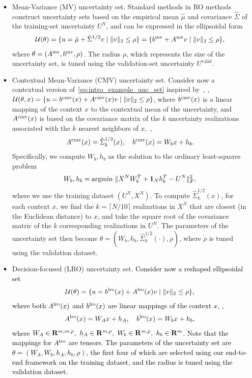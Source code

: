 \documentclass[11pt]{article}
\newcommand{\RC}[1]{\textcolor{black}{#1}}
\begin{document}
\begin{itemize}
    \item  Mean-Variance (MV) uncertainty set. 
Standard methods in \gls{RO} methods construct uncertainty sets based on
the empirical mean $\hat{\mu}$ and covariance $\hat{\Sigma}$ of the training-set uncertainty $U^{N}$, and can be expressed in the ellipsoidal form
\begin{equation}\label{eq:intro_example_unc_set}
	{\mathcal{U}}{(\theta)} = \{u = \hat{\mu} + \hat{\Sigma}^{1/2} v \mid \|v\|_2 \leq \rho\} = \{b^{\rm mv} + A^{\rm mv} v \mid \|v\|_2 \leq \rho\},
\end{equation}
where $\theta = (A^{\rm mv}, b^{\rm mv},\rho)$. 
The radius $\rho$, which represents the size of the uncertainty set, is tuned using the validation-set uncertainty $U^{\text{valid}}$.
\item Contextual Mean-Variance (CMV) uncertainty set. Consider now a contextual version of~\eqref{eq:intro_example_unc_set} inspired by~\cite{knn}, \ie,
${\mathcal{U}}(\theta,x) =\{u = b^{\rm cmv}(x) + A^{\rm cmv}(x)v \mid \|v\|_2 \leq \rho\}$, where $b^{\rm cmv}(x)$ is a linear mapping of the context $x$ to the contextual mean of the uncertainty, and $A^{\rm cmv}(x)$ is based on the covariance matrix of the $k$ uncertainty realizations associated with the $k$ nearest neighbors of $x$,~\ie,
\begin{equation}
    A^{\rm cmv}(x) = \hat{\Sigma}_k^{1/2}(x),\quad b^{\rm cmv}(x) = W_bx+h_b.
\end{equation} 
 Specifically, we compute $W_b,h_b$ as the solution to the ordinary least-squares problem
$$W_b,h_b=\text{argmin}~\|X^N W_b^T + \mathbf 1_{N}h_b^T - U^N\|_F^2,$$
where we use the training dataset $(U^N, X^N)$. To compute $\hat{\Sigma}_k^{1/2}(x)$, for each context $x$, we find the $k = \lceil N/10\rceil$ realizations in $X^N$ that are closest (in the Euclidean distance) to $x$, and take the square root of the covariance matric of the $k$ corresponding realizations in $U^N$. The parameters of the uncertainty set then become $\theta = (W_b,h_b, \hat{\Sigma}_k^{1/2}(\cdot),\rho)$, where $\rho$ is tuned using the validation dataset. 
\item Decision-focused (LRO) uncertainty set.
\RC{Consider now a reshaped ellipsoidal set
$${\mathcal{U}}(\theta) =\{u = b^{\rm lro}(x) + A^{\rm lro}(x) v \mid \|v\|_2 \leq \rho\},$$ where both $A^{\rm lro}(x)$ and $b^{\rm lro}(x)$ are linear mappings of the context $x$, \ie,
\begin{equation}
\label{eq:lin_map}
    A^{\rm lro}(x) = W_Ax+ h_A,\quad b^{\rm lro}(x) = W_bx+h_b,
\end{equation}
where $W_A\in {\mathbf R}^{m,m,p},~h_A\in {\mathbf R}^{m,p},~W_b\in {\mathbf R}^{m,p},~h_b \in{\mathbf R}^m$. Note that the mappings for $A^{\rm lro}$ are tensors.  
The parameters of the uncertainty set are $\theta = (W_A, W_b, h_A, h_b, \rho)$, the first four of which are selected using our end-to-end framework on the training dataset, and the radius is tuned using the validation dataset.}
\end{itemize}
\end{document}
